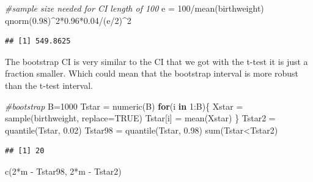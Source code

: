 \documentclass[
]{article}
\newenvironment{Shaded}{\begin{snugshade}}{\end{snugshade}}
\newcommand{\AttributeTok}[1]{\textcolor[rgb]{0.77,0.63,0.00}{#1}}
\newcommand{\CommentTok}[1]{\textcolor[rgb]{0.56,0.35,0.01}{\textit{#1}}}
\newcommand{\ConstantTok}[1]{\textcolor[rgb]{0.00,0.00,0.00}{#1}}
\newcommand{\ControlFlowTok}[1]{\textcolor[rgb]{0.13,0.29,0.53}{\textbf{#1}}}
\newcommand{\DecValTok}[1]{\textcolor[rgb]{0.00,0.00,0.81}{#1}}
\newcommand{\FloatTok}[1]{\textcolor[rgb]{0.00,0.00,0.81}{#1}}
\newcommand{\FunctionTok}[1]{\textcolor[rgb]{0.00,0.00,0.00}{#1}}
\newcommand{\NormalTok}[1]{#1}
\newcommand{\OtherTok}[1]{\textcolor[rgb]{0.56,0.35,0.01}{#1}}
\newcommand{\SpecialCharTok}[1]{\textcolor[rgb]{0.00,0.00,0.00}{#1}}
\begin{document}
\begin{Shaded}
\begin{Highlighting}[]
\CommentTok{\#sample size needed for CI length of 100}
\NormalTok{e }\OtherTok{=} \DecValTok{100}\SpecialCharTok{/}\FunctionTok{mean}\NormalTok{(birthweight)}
\FunctionTok{qnorm}\NormalTok{(}\FloatTok{0.98}\NormalTok{)}\SpecialCharTok{\^{}}\DecValTok{2}\SpecialCharTok{*}\FloatTok{0.96}\SpecialCharTok{*}\FloatTok{0.04}\SpecialCharTok{/}\NormalTok{(e}\SpecialCharTok{/}\DecValTok{2}\NormalTok{)}\SpecialCharTok{\^{}}\DecValTok{2}
\end{Highlighting}
\end{Shaded}

\begin{verbatim}
## [1] 549.8625
\end{verbatim}

The bootstrap CI is very similar to the CI that we got with the t-test
it is just a fraction smaller. Which could mean that the bootstrap
interval is more robust than the t-test interval.

\begin{Shaded}
\begin{Highlighting}[]
\CommentTok{\#bootstrap}
\NormalTok{B}\OtherTok{=}\DecValTok{1000}
\NormalTok{Tstar }\OtherTok{=} \FunctionTok{numeric}\NormalTok{(B)}
\ControlFlowTok{for}\NormalTok{(i }\ControlFlowTok{in} \DecValTok{1}\SpecialCharTok{:}\NormalTok{B)\{}
\NormalTok{  Xstar }\OtherTok{=} \FunctionTok{sample}\NormalTok{(birthweight, }\AttributeTok{replace=}\ConstantTok{TRUE}\NormalTok{)}
\NormalTok{  Tstar[i] }\OtherTok{=} \FunctionTok{mean}\NormalTok{(Xstar)}
\NormalTok{\}}
\NormalTok{Tstar2 }\OtherTok{=} \FunctionTok{quantile}\NormalTok{(Tstar, }\FloatTok{0.02}\NormalTok{)}
\NormalTok{Tstar98 }\OtherTok{=} \FunctionTok{quantile}\NormalTok{(Tstar, }\FloatTok{0.98}\NormalTok{)}
\FunctionTok{sum}\NormalTok{(Tstar}\SpecialCharTok{\textless{}}\NormalTok{Tstar2)}
\end{Highlighting}
\end{Shaded}

\begin{verbatim}
## [1] 20
\end{verbatim}

\begin{Shaded}
\begin{Highlighting}[]
\FunctionTok{c}\NormalTok{(}\DecValTok{2}\SpecialCharTok{*}\NormalTok{m }\SpecialCharTok{{-}}\NormalTok{ Tstar98, }\DecValTok{2}\SpecialCharTok{*}\NormalTok{m }\SpecialCharTok{{-}}\NormalTok{ Tstar2)}
\end{Highlighting}
\end{Shaded}
\end{document}
